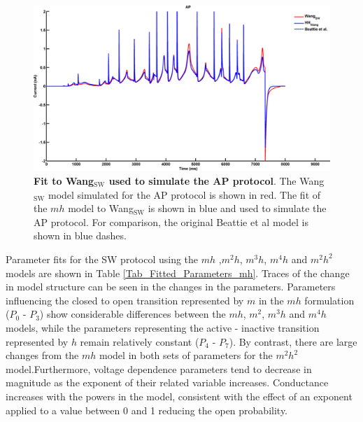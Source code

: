 \documentclass[11pt,a4paper,oneside]{article}
\begin{document}
\begin{figure}[hb]
\begin{center}
\includegraphics[scale=0.42]{Figures/Fig_mh_16713110_FP_sine_wave_wang_CP_ap_wang.png}
\caption{\textbf{Fit to Wang$_\text{SW}$ used to simulate the AP protocol}. The Wang$_\text{SW}$ model simulated for the AP protocol is shown in red. The fit of the $mh$ model to Wang$_\text{SW}$ is shown in blue and used to simulate the AP protocol. For comparison, the original Beattie et al model is shown in blue dashes.} 
\label{Fig_AP_Wang}
\end{center}
\end{figure}

Parameter fits for the SW protocol using the $mh$ ,$m^2h$, $m^3h$, $m^4h$ and $m^2h^2$ models are shown in Table \ref{Tab_Fitted_Parameters_mh}. Traces of the change in model structure can be seen in the changes in the parameters. Parameters influencing the closed to open transition represented by $m$ in the $mh$ formulation ($P_0$ - $P_3$) show considerable differences between the $mh$, $m^2$, $m^3h$ and $m^4h$ models, while the parameters representing the active - inactive transition represented by $h$ remain relatively constant ($P_4$ - $P_7$). By contrast, there are large changes from the $mh$ model in both sets of parameters for the $m^2h^2$ model.Furthermore, voltage dependence parameters tend to decrease in magnitude as the exponent of their related variable increases. Conductance increases with the powers in the model, consistent with the effect of an exponent applied to a value between 0 and 1 reducing the open probability. 
\end{document}
